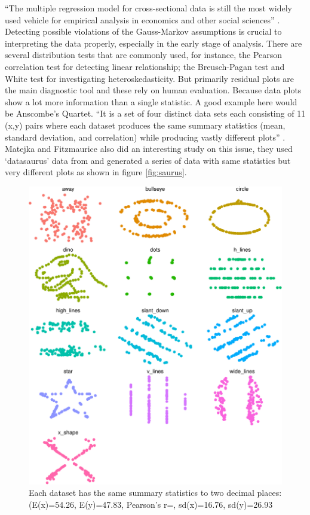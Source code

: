 \documentclass[12pt]{article}
\begin{document}
``The multiple regression model for cross-sectional data is still the
most widely used vehicle for empirical analysis in economics and other
social sciences'' \citep{IE17}. Detecting possible violations of the
Gauss-Markov assumptions is crucial to interpreting the data properly,
especially in the early stage of analysis. There are several
distribution tests that are commonly used, for instance, the Pearson
correlation test for detecting linear relationship; the Breusch-Pagan
test and White test for investigating heteroskedasticity. But primarily
residual plots are the main diagnostic tool and these rely on human
evaluation. Because data plots show a lot more information than a single
statistic. A good example here would be Anscombe's Quartet. ``It is a
set of four distinct data sets each consisting of 11 (x,y) pairs where
each dataset produces the same summary statistics (mean, standard
deviation, and correlation) while producing vastly different plots''
\citep{ANS73}. Matejka and Fitzmaurice also did an interesting study on
this issue, they used `datasaurus' data from \citet{DS16} and generated
a series of data with same statistics but very different plots as shown
in figure \ref{fig:saurus}. \citep{JM17}

\begin{figure}
\centering
\includegraphics{pc_plots_files/figure-latex/saurus-1.pdf}
\caption{Each dataset has the same summary statistics to two decimal
places: (E(x)=54.26, E(y)=47.83, Pearson's r=, sd(x)=16.76, sd(y)=26.93}
\end{figure}
\end{document}
